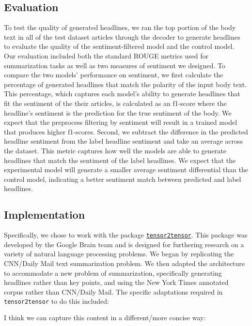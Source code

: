 \documentclass[11pt]{article}
\begin{document}
\subsection{Evaluation}
To test the quality of generated headlines, we ran the top portion of the body text in all of the test dataset articles through the decoder to generate headlines to evaluate the quality of the sentiment-filtered model and the control model. Our evaluation included both the standard ROUGE metrics used for summarization tasks as well as two measures of sentiment we designed. 
To compare the two models' performance on sentiment, we first calculate the percentage of generated headlines that match the polarity of the input body text. This percentage, which captures each model's ability to generate headlines that fit the sentiment of the their articles, is calculated as an f1-score where the headline's sentiment is the prediction for the true sentiment of the body. We expect that the preprocess filtering by sentiment will result in a trained model that produces higher f1-scores. Second, we subtract the difference in the predicted headline sentiment from the label headline sentiment and take an average across the dataset. This metric captures how well the models are able to generate headlines that match the sentiment of the label headlines. We expect that the experimental model will generate a smaller average sentiment differential than the control model, indicating a better sentiment match between predicted and label headlines.  
\subsection{Implementation}
Specifically, we chose to work with the package \href{https://github.com/tensorflow/tensor2tensor}{\texttt{tensor2tensor}}. This package was developed by the Google Brain team and is designed for furthering research on a variety of natural language processing problems\cite{vaswani-etal-2018-tensor2tensor}. We began by replicating the CNN/Daily Mail text summarization problem. We then adapted the architecture to accommodate a new problem of summarization, specifically generating headlines rather than key points, and using the New York Times annotated corpus rather than CNN/Daily Mail. The specific adaptations required in \texttt{tensor2tensor} to do this included:

I think we can capture this content in a different/more concise way:
\end{document}
